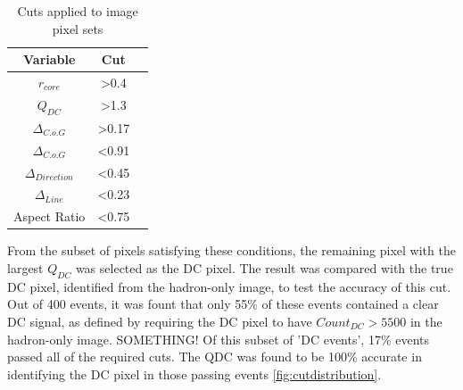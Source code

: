 \documentclass{article}
\begin{document}
\begin{table}[h!]
  \centering
  \caption{Cuts applied to image pixel sets}
  \label{tab:table1}
  \begin{tabular}{ccc}
    \toprule
    Variable & Cut\\
    \midrule
     $r_{core}$ & \textgreater 0.4 \\
     $Q_{DC}$ & \textgreater 1.3 \\
     $ \Delta_{C.o.G}$ & \textgreater 0.17 \\
     $ \Delta_{C.o.G}$ & \textless 0.91 \\
     $\Delta_{Direction}$ & \textless 0.45 \\
     $\Delta_{Line}$ & \textless 0.23 \\
     Aspect Ratio & \textless 0.75 \\
    \bottomrule
  \end{tabular}
\end{table}

From the subset of pixels satisfying these conditions, the remaining pixel with the largest $Q_{DC}$ was selected as the DC pixel. The result was compared with the true DC pixel, identified from the hadron-only image, to test the accuracy of this cut. Out of 400 events, it was fount that only 55\% of these events contained a clear DC signal, as defined by requiring the DC pixel to have $Count_{DC} > 5500$ in the hadron-only image. SOMETHING! Of this subset of 'DC events', 17\% events passed all of the required cuts. The QDC was found to be 100\% accurate in identifying the DC pixel in those passing events \ref{fig:cutdistribution}.
\end{document}
